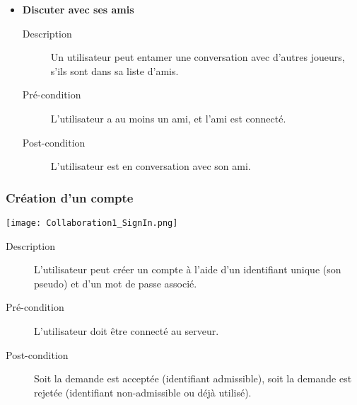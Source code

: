 \documentclass{article}
\begin{document}
\begin{itemize}
				\item \textbf{Discuter avec ses amis}
				\begin{description}
					\item[Description] Un utilisateur peut entamer une conversation avec d'autres joueurs, s'ils sont dans sa liste d'amis.
					\item[Pré-condition] L'utilisateur a au moins un ami, et l'ami est connecté.
					\item[Post-condition] L'utilisateur est en conversation avec son ami.
				\end{description}
			\end{itemize}

		\subsubsection{Création d'un compte}
			\begin{center}\texttt{[image: Collaboration1\_SignIn.png]}\end{center}

			\begin{description}
				\item[Description] L'utilisateur peut créer un compte à l'aide d'un identifiant unique (son pseudo) et d'un mot de passe associé.
				\item[Pré-condition] L'utilisateur doit être connecté au serveur.
				\item[Post-condition] Soit la demande est acceptée (identifiant admissible), soit la demande est rejetée (identifiant non-admissible ou déjà utilisé).
			\end{description}
\end{document}
